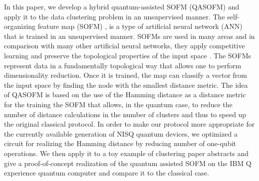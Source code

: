 \documentclass[pra,showkeys,twocolumn,showpacs,aps,10pt]{revtex4-1}
\begin{document}
In this paper, we develop a hybrid quantum-assisted SOFM (QASOFM)
and apply it to the data clustering problem in an unsupervised manner. The self-organizing feature map (SOFM) \cite{kohonen1990,kohonen1996,kohonen1997}, is a type of artificial neural network (ANN)
that is trained in an unsupervised manner.
SOFMs are used in many areas \cite{vilibic2016, guido1998, doszkocs1990, jones2012,mori2019,corsello2017,zhu2018,chea2016}
and in comparison with many other artificial neural networks, they apply competitive learning and preserve the topological properties of the input space \cite{kiviluotoa1996}.
The SOFMs represent data in a fundamentally topological way that allows one to perform dimensionality reduction.
Once it is trained, the map can classify a vector from the input space by finding the node with the smallest distance metric. The idea of QASOFM is based on the use of the Hamming distance as a distance metric for the training the SOFM that allows, in the quantum case, to reduce the number of distance calculations in the number of clusters and thus to speed up the original classical protocol.
In order to make our protocol more appropriate for the currently available generation of NISQ quantum devices, we optimized a circuit for realizing the Hamming distance by reducing number of one-qubit operations. We then apply it to a toy example of clustering paper abstracts and give a proof-of-concept realization of the quantum assisted SOFM on the IBM Q experience quantum computer \cite{ibmq}
and compare it to the classical case.
\end{document}
